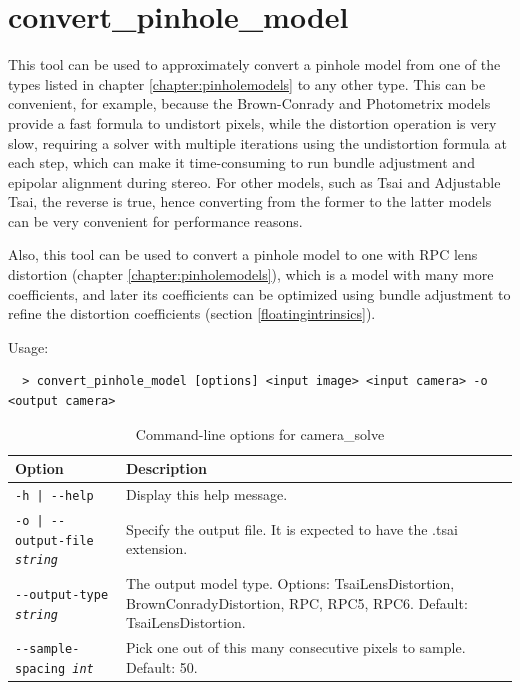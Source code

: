 \section{convert\_pinhole\_model}
\label{convertpinholemodel}

This tool can be used to approximately convert a pinhole model from one
of the types listed in chapter \ref{chapter:pinholemodels} to any other
type. This can be convenient, for example, because the Brown-Conrady and Photometrix models
provide a fast formula to undistort pixels, while the distortion operation is very slow,
requiring a solver with multiple iterations using the undistortion formula at each step,
which can make it time-consuming to run bundle adjustment and epipolar alignment during stereo.
For other models, such as Tsai and Adjustable Tsai, the reverse is true, hence converting
from the former to the latter models can be very convenient for performance reasons. 

Also, this tool can be used to convert a pinhole model to one with RPC
lens distortion (chapter \ref{chapter:pinholemodels}), which is a model
with many more coefficients, and later its coefficients can be optimized
using bundle adjustment to refine the distortion coefficients (section \ref{floatingintrinsics}). 


Usage:
\begin{verbatim}
  > convert_pinhole_model [options] <input image> <input camera> -o <output camera>
\end{verbatim}

\begin{longtable}{|l|p{7.5cm}|}
\caption{Command-line options for camera\_solve}
\label{tbl:camerasolve}
\endfirsthead
\endhead
\endfoot
\endlastfoot
\hline
Option & Description \\ \hline \hline
\texttt{-h | -\/-help } & Display this help message.\\ \hline

\texttt{-o | -\/-output-file \textit{string} } & Specify the output file. It is expected to have the .tsai extension. \\ \hline

\texttt{-\/-output-type \textit{string}} & The output model type. Options: TsaiLensDistortion, 
BrownConradyDistortion, RPC, RPC5, RPC6. Default: TsaiLensDistortion.\\ \hline

\texttt{-\/-sample-spacing \textit{int}} & Pick one out of this many
consecutive pixels to sample. Default: 50. \\ \hline

\end{longtable}

